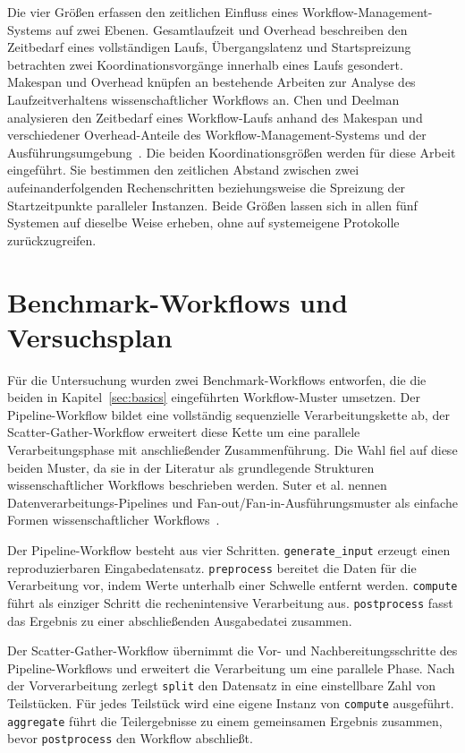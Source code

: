 Die vier Größen erfassen den zeitlichen Einfluss eines
Workflow-Management-Systems auf zwei Ebenen. Gesamtlaufzeit und
Overhead beschreiben den Zeitbedarf eines vollständigen Laufs,
Übergangslatenz und Startspreizung betrachten zwei
Koordinationsvorgänge innerhalb eines Laufs gesondert. Makespan und Overhead knüpfen an bestehende Arbeiten zur
Analyse des Laufzeitverhaltens wissenschaftlicher Workflows an.
Chen und Deelman analysieren den Zeitbedarf eines Workflow-Laufs
anhand des Makespan und verschiedener Overhead-Anteile des
Workflow-Management-Systems und der Ausführungsumgebung~\cite{chen2011overhead}. Die beiden
Koordinationsgrößen werden für diese Arbeit eingeführt. Sie bestimmen den zeitlichen Abstand zwischen zwei aufeinanderfolgenden
Rechenschritten beziehungsweise die Spreizung der Startzeitpunkte
paralleler Instanzen. Beide Größen lassen sich in allen fünf
Systemen auf dieselbe Weise erheben, ohne auf systemeigene
Protokolle zurückzugreifen.

\section{Benchmark-Workflows und Versuchsplan}
\label{sec:methodik:versuchsplan}

Für die Untersuchung wurden zwei Benchmark-Workflows entworfen, die
die beiden in Kapitel~\ref{sec:basics} eingeführten Workflow-Muster
umsetzen. Der Pipeline-Workflow bildet eine vollständig
sequenzielle Verarbeitungskette ab, der Scatter-Gather-Workflow
erweitert diese Kette um eine parallele Verarbeitungsphase mit
anschließender Zusammenführung. Die Wahl fiel auf diese beiden
Muster, da sie in der Literatur als grundlegende Strukturen
wissenschaftlicher Workflows beschrieben werden. Suter et al. nennen Datenverarbeitungs-Pipelines und Fan-out/Fan-in-Ausführungsmuster als einfache Formen wissenschaftlicher Workflows~\cite[S.~4]{suter2026terminology}.

Der Pipeline-Workflow besteht aus vier Schritten.
\texttt{generate\_input} erzeugt einen reproduzierbaren
Eingabedatensatz. \texttt{preprocess} bereitet die Daten für die
Verarbeitung vor, indem Werte unterhalb einer Schwelle entfernt
werden. \texttt{compute} führt als einziger Schritt die
rechenintensive Verarbeitung aus. \texttt{postprocess} fasst das
Ergebnis zu einer abschließenden Ausgabedatei zusammen.

Der Scatter-Gather-Workflow übernimmt die Vor- und
Nachbereitungsschritte des Pipeline-Workflows und erweitert die
Verarbeitung um eine parallele Phase. Nach der Vorverarbeitung
zerlegt \texttt{split} den Datensatz in eine einstellbare Zahl von
Teilstücken. Für jedes Teilstück wird eine eigene Instanz von
\texttt{compute} ausgeführt. \texttt{aggregate} führt die
Teilergebnisse zu einem gemeinsamen Ergebnis zusammen, bevor
\texttt{postprocess} den Workflow abschließt.

